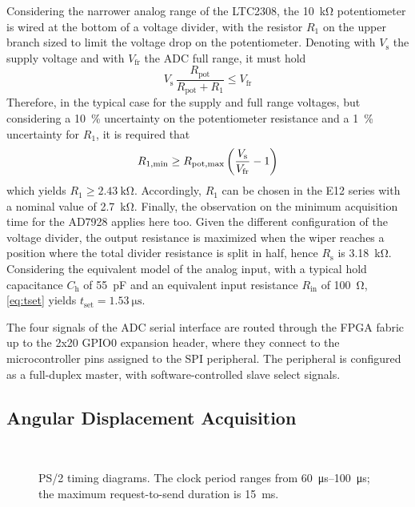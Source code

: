 Considering the narrower analog range of the LTC2308, the \qty{10}{\kohm} potentiometer is wired at the bottom of a voltage divider, with the resistor $R_1$ on the upper branch sized to limit the voltage drop on the potentiometer. Denoting with $V_\text{s}$ the supply voltage and with $V_\text{fr}$ the ADC full range, it must hold
\[
    V_\text{s}\,\frac{R_\text{pot}}{R_\text{pot} + R_1} \le V_\text{fr}
\]
Therefore, in the typical case for the supply and full range voltages, but considering a \qty{10}{\percent} uncertainty on the potentiometer resistance and a \qty{1}{\percent} uncertainty for $R_1$, it is required that
\[
    R_{1,\text{min}} \ge 
    R_{\text{pot},\text{max}}\,\pqty*{\frac{V_\text{s}}{V_\text{fr}}-1}
\]
which yields $R_1 \ge \qty{2.43}{\kohm}$. Accordingly, $R_1$ can be chosen in the E12 series with a nominal value of \qty{2.7}{\kohm}.
Finally, the observation on the minimum acquisition time for the AD7928 applies here too. Given the different configuration of the voltage divider, the output resistance is maximized when the wiper reaches a position where the total divider resistance is split in half, hence $R_\text{s}$ is \qty{3.18}{\kohm}. Considering the equivalent model of the analog input, with a typical hold capacitance $C_\text{h}$ of \qty{55}{\pF} and an equivalent input resistance $R_\text{in}$ of \qty{100}{\ohm}, \cref{eq:tset} yields $t_\text{set} = \qty{1.53}{\us}$.

The four signals of the ADC serial interface are routed through the FPGA fabric up to the 2x20 GPIO0 expansion header, where they connect to the microcontroller pins assigned to the SPI peripheral. The peripheral is configured as a full-duplex master, with software-controlled slave select signals.

\subsection{Angular Displacement Acquisition}\label{subsec:ps2}

\begin{figure}
    \centering
    \\
    \caption{PS/2 timing diagrams. The clock period ranges from \qtyrange{60}{100}{\micro\s}; the maximum request-to-send duration is \qty{15}{\milli\s}.}
    \label{fig:ps2_timing}
\end{figure}

